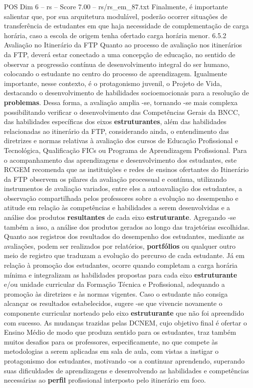 \begin{textsample}{POS Dim 6 – rs – Score 7.00 – rs/rs\_em\_87.txt}
Finalmente, é importante salientar que, por sua arquitetura modulável, poderão ocorrer situações de transferência de estudantes em que haja necessidade de complementação de carga horária, caso a escola de origem tenha ofertado carga horária menor. 6.5.2 Avaliação no Itinerário da FTP Quanto ao processo de avaliação nos itinerários da FTP, deverá estar conectado a uma concepção de educação, no sentido de observar a progressão contínua de desenvolvimento integral do ser humano, colocando o estudante no centro do processo de aprendizagem.
Igualmente importante, nesse contexto, é o protagonismo juvenil, o Projeto de Vida, destacando o desenvolvimento de habilidades socioemocionais para a resolução de \textbf{problemas}.
Dessa forma, a avaliação amplia -se, tornando -se mais complexa possibilitando verificar o desenvolvimento das Competências Gerais da BNCC, das habilidades específicas dos eixos \textbf{estruturantes}, além das habilidades relacionadas ao itinerário da FTP, considerando ainda, o entendimento das diretrizes e normas relativas à avaliação dos cursos de Educação Profissional e Tecnológica, Qualificação FICs ou Programa de Aprendizagem Profissional.
Para o acompanhamento das aprendizagens e desenvolvimento dos estudantes, este RCGEM recomenda que as instituições e redes de ensinos ofertantes do Itinerário da FTP observem os pilares da avaliação processual e contínua, utilizando instrumentos de avaliação variados, entre eles a autoavaliação dos estudantes, a observação compartilhada pelos professores sobre a evolução no desempenho e atitude em relação às competências e habilidades a serem desenvolvidas e a análise dos produtos \textbf{resultantes} de cada eixo \textbf{estruturante}.
Agregando -se também a isso, a análise dos produtos gerados ao longo das trajetórias escolhidas.
Quanto aos registros dos resultados do desempenho dos estudantes, mediante as avaliações, podem ser realizados por relatórios, \textbf{portfólios} ou qualquer outro meio de registro que traduzam a evolução do percurso de cada estudante.
Já em relação à promoção dos estudantes, ocorre quando completam a carga horária mínima e integralizam as habilidades propostas para cada eixo \textbf{estruturante} e/ou unidade curricular da Formação Técnica e Profissional, adequando a promoção às diretrizes e às normas vigentes.
Caso o estudante não consiga alcançar os resultados estabelecidos, sugere -se que vivencie novamente o componente curricular norteado pelo eixo \textbf{estruturante} que não foi apreendido com sucesso.
As mudanças trazidas pelas DCNEM, cujo objetivo final é ofertar o Ensino Médio de modo que produza sentido para os estudantes, traz também muitos desafios para os professores, especificamente, no que compete às metodologias a serem aplicadas em sala de aula, com vistas a instigar o protagonismo dos estudantes, motivando -os a continuar aprendendo, superando suas dificuldades de aprendizagens e desenvolvendo as habilidades e competências necessárias ao \textbf{perfil} profissional interposto pelo itinerário em foco.

\end{textsample}
